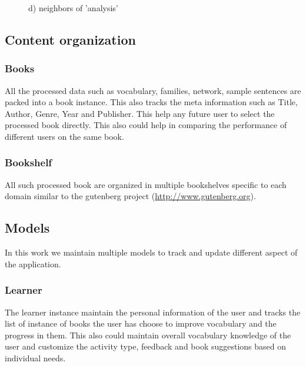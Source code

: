 \documentclass[11pt,a4paper]{article}
\begin{document}
\begin{figure}[h!]
\begin{center}
\caption{d) neighbors of 'analysis' }

\end{center}
\end{figure}


\subsection{Content organization}
\subsubsection{Books}
All the processed data such as vocabulary, families, network, sample sentences
are packed into a book instance. This also tracks the meta information such as
Title, Author, Genre, Year and Publisher. This help any future user to select
the processed book directly. This also could help in comparing the performance
of different users on the same book.

\subsubsection{Bookshelf}
All such processed book are organized in multiple bookshelves specific to each
domain similar to the gutenberg project (\url{http://www.gutenberg.org}).

\subsection{Models}
In this work we maintain multiple models to track and update different aspect
of the application.

\subsubsection{Learner}
The learner instance maintain the personal information of the user and tracks
the list of instance of books the user has choose to improve vocabulary and the
progress in them. This also could maintain overall vocabulary knowledge of
the user and customize the activity type, feedback and book suggestions based
on individual needs.
\end{document}
